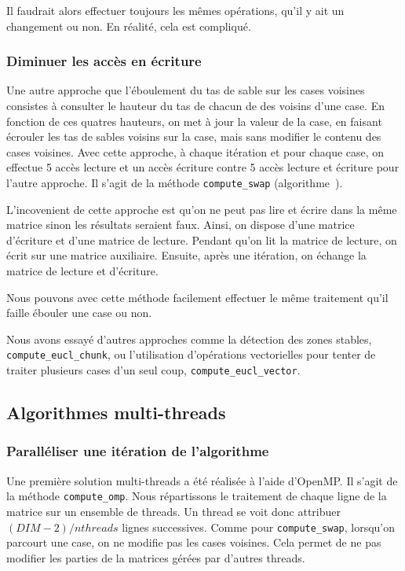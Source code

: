 Il faudrait alors effectuer toujours les mêmes opérations, qu'il y ait
un changement ou non. En réalité, cela est compliqué.
\medskip

\subsubsection{Diminuer les accès en écriture}

Une autre approche que l'éboulement du tas de sable sur les cases
voisines consistes à consulter le hauteur du tas de chacun de des
voisins d'une case. En fonction de ces quatres hauteurs, on met à jour
la valeur de la case, en faisant écrouler les tas de sables voisins
sur la case, mais sans modifier le contenu des cases voisines. Avec
cette approche, à chaque itération et pour chaque case, on effectue 5
accès lecture et un accès écriture contre 5 accès lecture et écriture
pour l'autre approche. Il s'agit de la méthode
\texttt{compute\eucl\_swap} (algorithme~).

L'incovenient de cette approche est qu'on ne peut pas lire et écrire
dans la même matrice sinon les résultats seraient faux. Ainsi, on
dispose d'une matrice d'écriture et d'une matrice de lecture. Pendant
qu'on lit la matrice de lecture, on écrit sur une matrice
auxiliaire. Ensuite, après une itération, on échange la matrice de
lecture et d'écriture.

Nous pouvons avec cette méthode facilement effectuer le même
traitement qu'il faille ébouler une case ou non.
\bigskip

Nous avons essayé d'autres approches comme la détection des zones
stables, \texttt{compute\_eucl\_chunk}, ou l'utilisation d'opérations vectorielles pour tenter de
traiter plusieurs cases d'un seul coup, \texttt{compute\_eucl\_vector}.

\subsection{Algorithmes multi-threads}

\subsubsection{Paralléliser une itération de l'algorithme}

Une première solution multi-threads a été réalisée à l'aide
d'OpenMP. Il s'agit de la méthode \texttt{compute\_omp}.  Nous
répartissons le traitement de chaque ligne de la matrice sur un
ensemble de threads. Un thread se voit donc attribuer
$(DIM-2)/nthreads$ lignes successives. Comme pour
\texttt{compute\eucl\_swap}, lorsqu'on parcourt une case, on ne
modifie pas les cases voisines. Cela permet de ne pas modifier les
parties de la matrices gérées par d'autres threads.

